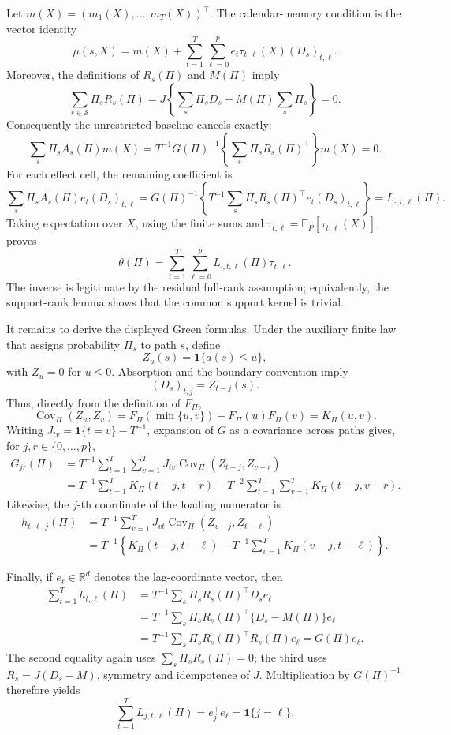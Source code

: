 Let \(m(X)=(m_1(X),\ldots,m_T(X))^{\top}\).  The calendar-memory condition is the vector identity
\[
 \mu(s,X)=m(X)+\sum_{t=1}^T\sum_{\ell=0}^p
 e_t\tau_{t,\ell}(X)(D_s)_{t,\ell}.
\]
Moreover, the definitions of \(R_s(\Pi)\) and \(M(\Pi)\) imply
\[
 \sum_{s\in\mathcal S}\Pi_sR_s(\Pi)
 =J\left\{\sum_s\Pi_sD_s-M(\Pi)\sum_s\Pi_s\right\}=0.
\]
Consequently the unrestricted baseline cancels exactly:
\[
 \sum_s\Pi_sA_s(\Pi)m(X)
 =T^{-1}G(\Pi)^{-1}\left\{\sum_s\Pi_sR_s(\Pi)^{\top}\right\}m(X)=0.
\]
For each effect cell, the remaining coefficient is
\[
 \sum_s\Pi_sA_s(\Pi)e_t(D_s)_{t,\ell}
 =G(\Pi)^{-1}\left\{T^{-1}\sum_s\Pi_sR_s(\Pi)^{\top}e_t(D_s)_{t,\ell}\right\}
 =L_{\cdot,t,\ell}(\Pi).
\]
Taking expectation over \(X\), using the finite sums and \(\tau_{t,\ell}=\mathbb E_P[\tau_{t,\ell}(X)]\), proves
\[
 \theta(\Pi)=\sum_{t=1}^T\sum_{\ell=0}^pL_{\cdot,t,\ell}(\Pi)\tau_{t,\ell}.
\]
The inverse is legitimate by the residual full-rank assumption; equivalently, the support-rank lemma shows that the common support kernel is trivial.

It remains to derive the displayed Green formulas.  Under the auxiliary finite law that assigns probability \(\Pi_s\) to path \(s\), define
\[
 Z_u(s)=\mathbf 1\{a(s)\leq u\},
\]
with \(Z_u=0\) for \(u\leq0\).  Absorption and the boundary convention imply
\[
 (D_s)_{t,j}=Z_{t-j}(s).
\]
Thus, directly from the definition of \(F_{\Pi}\),
\[
 \operatorname{Cov}_{\Pi}(Z_u,Z_v)
 =F_{\Pi}(\min\{u,v\})-F_{\Pi}(u)F_{\Pi}(v)
 =K_{\Pi}(u,v).
\]
Writing \(J_{tv}=\mathbf 1\{t=v\}-T^{-1}\), expansion of \(G\) as a covariance across paths gives, for \(j,r\in\{0,\ldots,p\}\),
\[
 \begin{aligned}
 G_{jr}(\Pi)
 &=T^{-1}\sum_{t=1}^T\sum_{v=1}^TJ_{tv}
       \operatorname{Cov}_{\Pi}(Z_{t-j},Z_{v-r})\\
 &=T^{-1}\sum_{t=1}^TK_{\Pi}(t-j,t-r)
   -T^{-2}\sum_{t=1}^T\sum_{v=1}^TK_{\Pi}(t-j,v-r).
 \end{aligned}
\]
Likewise, the \(j\)-th coordinate of the loading numerator is
\[
 \begin{aligned}
 h_{t,\ell,j}(\Pi)
 &=T^{-1}\sum_{v=1}^TJ_{vt}
       \operatorname{Cov}_{\Pi}(Z_{v-j},Z_{t-\ell})\\
 &=T^{-1}\left\{K_{\Pi}(t-j,t-\ell)
       -T^{-1}\sum_{v=1}^TK_{\Pi}(v-j,t-\ell)\right\}.
 \end{aligned}
\]

Finally, if \(e_{\ell}\in\mathbb R^d\) denotes the lag-coordinate vector, then
\[
 \begin{aligned}
 \sum_{t=1}^Th_{t,\ell}(\Pi)
 &=T^{-1}\sum_s\Pi_sR_s(\Pi)^{\top}D_se_{\ell}\\
 &=T^{-1}\sum_s\Pi_sR_s(\Pi)^{\top}\{D_s-M(\Pi)\}e_{\ell}\\
 &=T^{-1}\sum_s\Pi_sR_s(\Pi)^{\top}R_s(\Pi)e_{\ell}
 =G(\Pi)e_{\ell}.
 \end{aligned}
\]
The second equality again uses \(\sum_s\Pi_sR_s(\Pi)=0\); the third uses \(R_s=J(D_s-M)\), symmetry and idempotence of \(J\).  Multiplication by \(G(\Pi)^{-1}\) therefore yields
\[
 \sum_{t=1}^TL_{j,t,\ell}(\Pi)=e_j^{\top}e_{\ell}=\mathbf 1\{j=\ell\}.
\]


